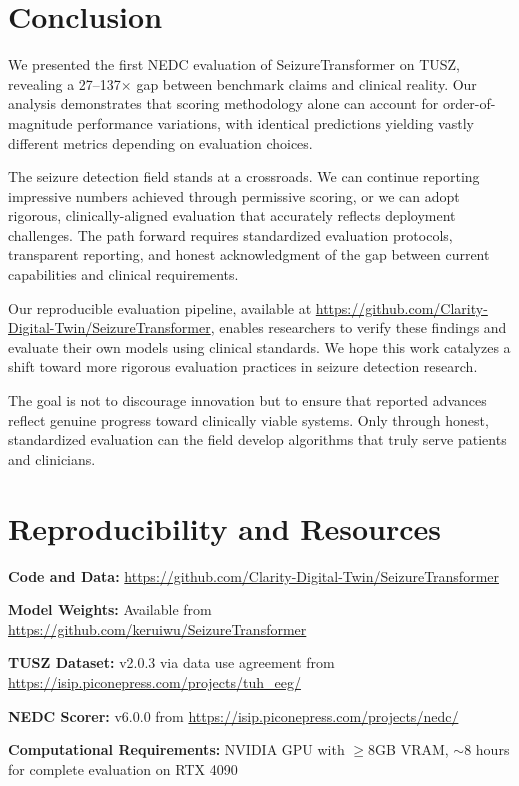\documentclass[10pt,a4paper]{article}
\begin{document}
\section{Conclusion}

We presented the first NEDC evaluation of SeizureTransformer on TUSZ, revealing a 27--137$\times$ gap between benchmark claims and clinical reality. Our analysis demonstrates that scoring methodology alone can account for order-of-magnitude performance variations, with identical predictions yielding vastly different metrics depending on evaluation choices.

The seizure detection field stands at a crossroads. We can continue reporting impressive numbers achieved through permissive scoring, or we can adopt rigorous, clinically-aligned evaluation that accurately reflects deployment challenges. The path forward requires standardized evaluation protocols, transparent reporting, and honest acknowledgment of the gap between current capabilities and clinical requirements.

Our reproducible evaluation pipeline, available at \url{https://github.com/Clarity-Digital-Twin/SeizureTransformer}, enables researchers to verify these findings and evaluate their own models using clinical standards. We hope this work catalyzes a shift toward more rigorous evaluation practices in seizure detection research.

The goal is not to discourage innovation but to ensure that reported advances reflect genuine progress toward clinically viable systems. Only through honest, standardized evaluation can the field develop algorithms that truly serve patients and clinicians.

\section{Reproducibility and Resources}

\textbf{Code and Data:} \url{https://github.com/Clarity-Digital-Twin/SeizureTransformer}

\textbf{Model Weights:} Available from \url{https://github.com/keruiwu/SeizureTransformer}

\textbf{TUSZ Dataset:} v2.0.3 via data use agreement from \url{https://isip.piconepress.com/projects/tuh_eeg/}

\textbf{NEDC Scorer:} v6.0.0 from \url{https://isip.piconepress.com/projects/nedc/}

\textbf{Computational Requirements:} NVIDIA GPU with $\geq$8GB VRAM, $\sim$8 hours for complete evaluation on RTX 4090
\end{document}
